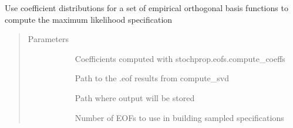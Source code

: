 \documentclass[letterpaper,10pt,english]{sphinxmanual}
\begin{document}
\begin{fulllineitems}
\label{\detokenize{stochprop.eofs:stochprop.eofs.maximum_likelihood_profile}}
Use coefficient distributions for a set of empirical orthogonal
basis functions to compute the maximum likelihood specification
\begin{quote}\begin{description}
\item[{Parameters}] \leavevmode\begin{description}
\item[{}] \leavevmode
Coefficients computed with stochprop.eofs.compute\_coeffs

\item[{}] \leavevmode
Path to the .eof results from compute\_svd

\item[{}] \leavevmode
Path where output will be stored

\item[{}] \leavevmode
Number of EOFs to use in building sampled specifications

\end{description}

\end{description}\end{quote}

\end{fulllineitems}

\end{document}
